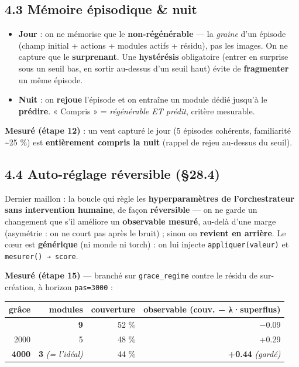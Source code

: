 \documentclass[
  french,
  11pt,
]{article}
\newcounter{none} %
\providecommand{\tightlist}{%
  \setlength{\itemsep}{0pt}\setlength{\parskip}{0pt}}
\begin{document}
\subsection{4.3 Mémoire épisodique \&
nuit}\label{muxe9moire-uxe9pisodique-nuit}

\begin{itemize}
\tightlist
\item
  \textbf{Jour} : on ne mémorise que le \textbf{non-régénérable} --- la
  \emph{graine} d'un épisode (champ initial + actions + modules actifs +
  résidu), pas les images. On ne capture que le \textbf{surprenant}. Une
  \textbf{hystérésis} obligatoire (entrer en surprise sous un seuil bas,
  en sortir au-dessus d'un seuil haut) évite de \textbf{fragmenter} un
  même épisode.
\item
  \textbf{Nuit} : on \textbf{rejoue} l'épisode et on entraîne un module
  dédié jusqu'à le \textbf{prédire}. « Compris » = \emph{régénérable ET
  prédit}, critère mesurable.
\end{itemize}

\textbf{Mesuré (étape 12)} : un vent capturé le jour (5 épisodes
cohérents, familiarité \textasciitilde25 \%) est \textbf{entièrement
compris la nuit} (rappel de rejeu au-dessus du seuil).

\subsection{4.4 Auto-réglage réversible
(§28.4)}\label{auto-ruxe9glage-ruxe9versible-28.4}

Dernier maillon : la boucle qui règle les \textbf{hyperparamètres de
l'orchestrateur sans intervention humaine}, de façon \textbf{réversible}
--- on ne garde un changement que s'il améliore un \textbf{observable
mesuré}, au-delà d'une marge (asymétrie : on ne court pas après le
bruit) ; sinon on \textbf{revient en arrière}. Le cœur est
\textbf{générique} (ni monde ni torch) : on lui injecte
\texttt{appliquer(valeur)} et \texttt{mesurer()\ →\ score}.

\textbf{Mesuré (étape 15)} --- branché sur \texttt{grace\_regime} contre
le résidu de sur-création, à horizon \texttt{pas=3000} :

{\def\LTcaptype{none} %
\begin{longtable}[]{@{}rrrr@{}}
\toprule\noalign{}
grâce & modules & couverture & observable (couv. − λ·superflus) \\
\midrule\noalign{}
\endhead
\bottomrule\noalign{}
\endlastfoot
1000 & \textbf{9} & 52 \% & −0.09 \\
2000 & 5 & 48 \% & +0.29 \\
\textbf{4000} & \textbf{3} \emph{(= l'idéal)} & 44 \% & \textbf{+0.44}
\emph{(gardé)} \\
\end{longtable}
}
\end{document}
